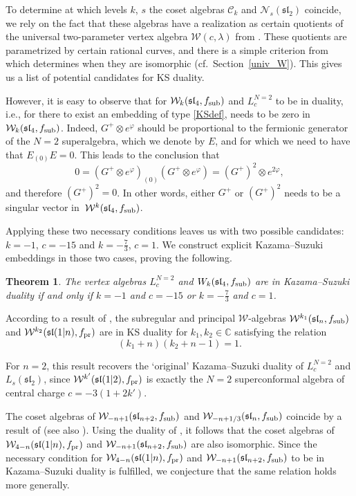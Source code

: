 \documentclass[pdftex]{sigma}
\numberwithin{equation}{section}
\newtheorem{Theorem}{Theorem}[section]
\begin{document}
To determine at which levels $k$, $s$ the coset algebras $\mathcal C_k$ and $\mathcal N_s(\mathfrak{sl}_2)$ coincide, we rely on the fact that these algebras have a realization as certain quotients of the universal two-parameter vertex algebra $\mathcal W (c, \lambda)$ from \cite{Linshaw}. These quotients are parametrized by certain rational curves, and there is a simple criterion from \cite{Linshaw} which determines when they are isomorphic (cf.\ Section~\ref{univ_W}). This gives us a list of potential candidates for KS duality.

However, it is easy to observe that for $\mathcal{W}_k(\mathfrak{sl}_4, f_{\rm sub})$ and $L^{N=2}_c$ to be in duality, i.e., for there to exist an embedding of type \eqref{KSdef},  needs to be zero in $\mathcal W_k(\mathfrak{sl}_4, f_{\rm sub})$.
 Indeed, $G^+ \otimes e^{\varphi}$ should be proportional to the fermionic generator of the $N=2$ superalgebra, which we denote by $E$, and for which we need to have that $E_{(0)} E =0$. This leads to the conclusion that
 \[
 0 = (G^+ \otimes e^{\varphi} )_{(0)}  (G^+ \otimes e^{\varphi} ) = (G^+) ^2 \otimes e^{2 \varphi},
 \]
 and therefore $(G^+)^2 =0$. In other words, either $G^+$ or $(G^+)^2$ needs to be a singular vector in~$\mathcal W^k(\mathfrak{sl}_4, f_{\rm sub})$.

Applying these two necessary conditions leaves us with two possible candidates: $k=-1$, $c=-15$ and $k=-\frac 73$, $c=1$. We construct explicit Kazama--Suzuki embeddings in those two cases, proving the following.

\begin{Theorem}The vertex algebras $L^{N=2}_c$ and $W_k(\mathfrak{sl}_4, f_{\rm sub})$ are in Kazama--Suzuki duality if and only if $k=-1$ and $c=-15$ or $k=-\frac 73$ and $c=1$.
\end{Theorem}

According to a result of \cite{CGN}, the subregular and principal $\mathcal W$-algebras $\mathcal{W}^{k_1}(\mathfrak{sl}_n, f_{\rm sub})$ and $\mathcal{W}^{k_2} (\mathfrak{sl}(1|n), f_{\rm pr})$ are in KS duality for $k_1, k_2 \in \mathbb{C}$ satisfying the relation
\[ (k_1+ n) (k_2 + n - 1) = 1. \]

For $n=2$, this result recovers the `original' Kazama--Suzuki duality of $L^{N=2}_c$ and $L_s(\mathfrak{sl}_2)$, since $\mathcal{W}^{k'} (\mathfrak{sl}(1 \vert 2), f_{\rm pr})$ is exactly the $N=2$ superconformal algebra of central charge $c= - 3( 1+ 2k')$.

The coset algebras of $\mathcal W_{-n+1} (\mathfrak{sl}_{n+2}, f_{\rm sub})$ and $\mathcal W_{-n+ 1/3} (\mathfrak{sl}_n, f_{\rm sub})$ coincide by a result of \cite{CL} (see also \cite{Linshaw}). Using the duality of \cite{CGN}, it follows that the coset algebras of $\mathcal W_{4-n} (\mathfrak{sl}(1 \vert n), f_{\rm pr})$ and $\mathcal W_{-n+1} (\mathfrak{sl}_{n+2}, f_{\rm sub})$ are also isomorphic.
Since the necessary condition for $\mathcal W_{4-n} (\mathfrak{sl}(1\vert n), f_{\rm pr})$ and $\mathcal W_{-n+1} (\mathfrak{sl}_{n+2}, f_{\rm sub})$ to be in Kazama--Suzuki duality is fulfilled, we conjecture that the same relation holds more generally.
\end{document}
